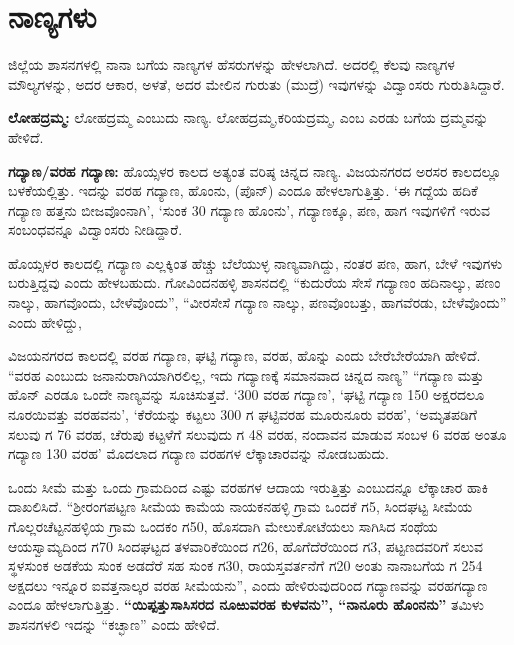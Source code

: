 \section{ನಾಣ್ಯಗಳು}

ಜಿಲ್ಲೆಯ ಶಾಸನಗಳಲ್ಲಿ ನಾನಾ ಬಗೆಯ ನಾಣ್ಯಗಳ ಹೆಸರುಗಳನ್ನು ಹೇಳಲಾಗಿದೆ. ಅದರಲ್ಲಿ ಕೆಲವು ನಾಣ್ಯಗಳ ಮೌಲ್ಯಗಳನ್ನು, ಅದರ ಆಕಾರ, ಅಳತೆ, ಅದರ ಮೇಲಿನ ಗುರುತು (ಮುದ್ರೆ) ಇವುಗಳನ್ನು ವಿದ್ವಾಂಸರು ಗುರುತಿಸಿದ್ದಾರೆ.

\textbf{ಲೋಹದ್ರಮ್ಮ: } ಲೋಹದ್ರಮ್ಮ ಎಂಬುದು ನಾಣ್ಯ. ಲೋಹದ್ರಮ್ಮ,ಕರಿಯದ್ರಮ್ಮ, ಎಂಬ ಎರಡು ಬಗೆಯ ದ್ರಮ್ಮವನ್ನು ಹೇಳಿದೆ.

\textbf{ಗದ್ಯಾಣ/ವರಹ ಗದ್ಯಾಣ: } ಹೊಯ್ಸಳರ ಕಾಲದ ಅತ್ಯಂತ ವರಿಷ್ಠ ಚಿನ್ನದ ನಾಣ್ಯ. ವಿಜಯನಗರದ ಅರಸರ ಕಾಲದಲ್ಲೂ ಬಳಕೆಯಲ್ಲಿತ್ತು. ಇದನ್ನು ವರಹ ಗದ್ಯಾಣ, ಹೊಂನು, (ಪೊನ್​) ಎಂದೂ ಹೇಳಲಾಗುತ್ತಿತ್ತು. ‘ಈ ಗದ್ದೆಯ ಹದಿಕೆ ಗದ್ಯಾಣ ಹತ್ತನು ಬೀಜವೊಂನಾಗಿ’, ‘ಸುಂಕ 30 ಗದ್ಯಾಣ ಹೊಂನು’, ಗದ್ಯಾಣಕ್ಕೂ, ಪಣ, ಹಾಗ ಇವುಗಳಿಗೆ ಇರುವ ಸಂಬಂಧವನ್ನೂ ವಿದ್ವಾಂಸರು ನೀಡಿದ್ದಾರೆ.

ಹೊಯ್ಸಳರ ಕಾಲದಲ್ಲಿ ಗದ್ಯಾಣ ಎಲ್ಲಕ್ಕಿಂತ ಹೆಚ್ಚು ಬೆಲೆಯುಳ್ಳ ನಾಣ್ಯವಾಗಿದ್ದು, ನಂತರ ಪಣ, ಹಾಗ, ಬೇಳೆ ಇವುಗಳು ಬರುತ್ತಿದ್ದವು ಎಂದು ಹೇಳಬಹುದು. ಗೋವಿಂದನಹಳ್ಳಿ ಶಾಸನದಲ್ಲಿ “ಕುದುರೆಯ ಸೇಸೆ ಗದ್ಯಾಣಂ ಹದಿನಾಲ್ಕು, ಪಣಂ ನಾಲ್ಕು, ಹಾಗವೊಂದು, ಬೇಳೆವೊಂದು”, “ವೀರಸೇಸೆ ಗದ್ಯಾಣ ನಾಲ್ಕು, ಪಣವೊಂಬತ್ತು, ಹಾಗವೆರಡು, ಬೇಳೆವೊಂದು” ಎಂದು ಹೇಳಿದ್ದು,

ವಿಜಯನಗರದ ಕಾಲದಲ್ಲಿ ವರಹ ಗದ್ಯಾಣ, ಘಟ್ಟಿ ಗದ್ಯಾಣ, ವರಹ, ಹೊನ್ನು ಎಂದು ಬೇರೆಬೇರೆಯಾಗಿ ಹೇಳಿದೆ. “ವರಹ ಎಂಬುದು ಜನಾನುರಾಗಿಯಾಗಿರಲಿಲ್ಲ, ಇದು ಗದ್ಯಾಣಕ್ಕೆ ಸಮಾನವಾದ ಚಿನ್ನದ ನಾಣ್ಯ” “ಗದ್ಯಾಣ ಮತ್ತು ಹೊನ್​ ಎರಡೂ ಒಂದೇ ನಾಣ್ಯವನ್ನು ಸೂಚಿಸುತ್ತವೆ. ‘300 ವರಹ ಗದ್ಯಾಣ’, ‘ಘಟ್ಟಿ ಗದ್ಯಾಣ 150 ಅಕ್ಷರದಲೂ ನೂರಯಿವತ್ತು ವರಹವನು’, ‘ಕೆರೆಯನ್ನು ಕಟ್ಟಲು 300 ಗ ಘಟ್ಟಿವರಹ ಮೂರುನೂರು ವರಹ’, ‘ಅಮೃತಪಡಿಗೆ ಸಲುವು ಗ 76 ವರಹ, ಚೆರುಪು ಕಟ್ಟಳೆಗೆ ಸಲುವುದು ಗ 48 ವರಹ, ನಂದಾವನ ಮಾಡುವ ಸಂಬಳ 6 ವರಹ ಅಂತೂ ಗದ್ಯಾಣ 130 ವರಹ’ ಮೊದಲಾದ ಗದ್ಯಾಣ ವರಹಗಳ ಲೆಕ್ಕಾಚಾರವನ್ನು ನೋಡಬಹುದು.

ಒಂದು ಸೀಮೆ ಮತ್ತು ಒಂದು ಗ್ರಾಮದಿಂದ ಎಷ್ಟು ವರಹಗಳ ಆದಾಯ ಇರುತ್ತಿತ್ತು ಎಂಬುದನ್ನೂ ಲೆಕ್ಕಾಚಾರ ಹಾಕಿ ದಾಖಲಿಸಿದೆ. “ಶ‍್ರೀರಂಗಪಟ್ಟಣ ಸೀಮೆಯ ಕಾಮೆಯ ನಾಯಕನಹಳ್ಳಿ ಗ್ರಾಮ ಒಂದಕೆ ಗ5, ಸಿಂದಘಟ್ಟ ಸೀಮೆಯ ಗೊಲ್ಲರಚೆಟ್ಟನಹಳ್ಳಿಯ ಗ್ರಾಮ ಒಂದಕಂ ಗ50, ಹೊಸದಾಗಿ ಮೇಲುಕೋಟೆಯಲು ಸಾಗಿಸಿದ ಸಂಥೆಯ ಆಯಸ್ವಾಮ್ಯದಿಂದ ಗ70 ಸಿಂದಘಟ್ಟದ ತಳವಾರಿಕೆಯಿಂದ ಗ26, ಹೊಗೆದೆರೆಯಿಂದ ಗ3, ಪಟ್ಟಣದವರಿಗೆ ಸಲುವ ಸ್ಥಳಸುಂಕ ಅಡಕೆಯ ಸುಂಕ ಅಡದೆರೆ ಸಹ ಸುಂಕ ಗ30, ರಾಯಸ್ತವರ್ತನೆಗೆ ಗ20 ಅಂತು ನಾನಾಬಗೆಯ ಗ 254 ಅಕ್ಷದಲು ಇನ್ನೂರ ಐವತ್ತನಾಲ್ಕರ ವರಹ ಸೀಮೆಯನು”, ಎಂದು ಹೇಳಿರುವುದರಿಂದ ಗದ್ಯಾಣವನ್ನು ವರಹಗದ್ಯಾಣ ಎಂದೂ ಹೇಳಲಾಗುತ್ತಿತ್ತು. \textbf{“ಯಿಪ್ಪತ್ತುಸಾಸಿಸರದ ನೂಱುವರಹ ಕುಳವನು”, “ನಾನೂರು ಹೊಂನನು”} ತಮಿಳು ಶಾಸನಗಳಲಿ ಇದನ್ನು “ಕಚ್ಛಾಣ” ಎಂದು ಹೇಳಿದೆ.

